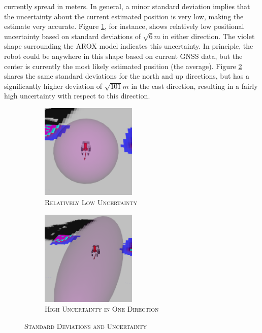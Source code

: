 \documentclass[english, master, utf8]{base/thesis_KBS}
\begin{document}
currently spread in meters. In general, a minor standard deviation implies that the uncertainty about the current estimated position is very low, making the estimate very accurate.
Figure \ref{fig:low_uncertainty}, for instance, shows relatively low positional uncertainty based on standard deviations of $\sqrt{6}m$ in either direction. The violet shape
surrounding the AROX model indicates this uncertainty. In principle, the robot could be anywhere in this shape based on current GNSS data, but the center is currently the most likely
estimated position (the average). Figure \ref{fig:high_uncertainty} shares the same standard deviations for the north and up directions, but has a significantly higher deviation of
$\sqrt{101}m$ in the east direction, resulting in a fairly high uncertainty with respect to this direction.
\begin{figure}[H]
    \centering
    \begin{subfigure}[b]{0.49\textwidth}
        \centering
        \includegraphics[width=0.5\textwidth]{pics/GNSS_cov_low.png}
        \caption{\textsc{Relatively Low Uncertainty}}
        \label{fig:low_uncertainty}
    \end{subfigure}
    \hfill
    \begin{subfigure}[b]{0.49\textwidth}
        \centering
        \includegraphics[width=0.5\textwidth]{pics/GNSS_cov_high.png}
        \caption{\textsc{High Uncertainty in One Direction}}
        \label{fig:high_uncertainty}
    \end{subfigure}
\caption{\textsc{Standard Deviations and Uncertainty}}
\label{fig:uncertainty_shape}
\end{figure}
\end{document}
